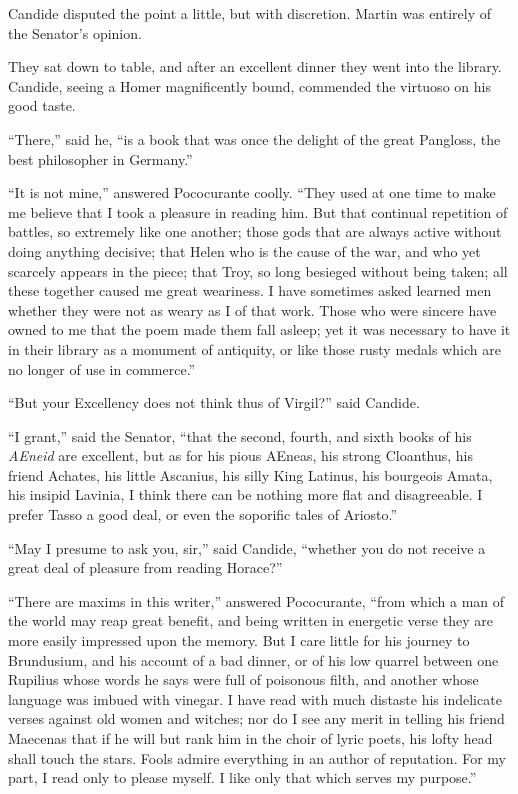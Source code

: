 Candide disputed the point a little, but with discretion. Martin was entirely of the Senator's opinion.

They sat down to table, and after an excellent dinner they went into the library. Candide, seeing a Homer magnificently bound, commended the virtuoso on his good taste.

``There,'' said he, ``is a book that was once the delight of the great Pangloss, the best philosopher in Germany.''

``It is not mine,'' answered Pococurante coolly. ``They used at one time to make me believe that I took a pleasure in reading him. But that continual repetition of battles, so extremely like one another; those gods that are always active without doing anything decisive; that Helen who is the cause of the war, and who yet scarcely appears in the piece; that Troy, so long besieged without being taken; all these together caused me great weariness. I have sometimes asked learned men whether they were not as weary as I of that work. Those who were sincere have owned to me that the poem made them fall asleep; yet it was necessary to have it in their library as a monument of antiquity, or like those rusty medals which are no longer of use in commerce.''

``But your Excellency does not think thus of Virgil?'' said Candide.

``I grant,'' said the Senator, ``that the second, fourth, and sixth books of his \textit{AEneid} are excellent, but as for his pious AEneas, his strong Cloanthus, his friend Achates, his little Ascanius, his silly King Latinus, his bourgeois Amata, his insipid Lavinia, I think there can be nothing more flat and disagreeable. I prefer Tasso a good deal, or even the soporific tales of Ariosto.''

``May I presume to ask you, sir,'' said Candide, ``whether you do not receive a great deal of pleasure from reading Horace?''

``There are maxims in this writer,'' answered Pococurante, ``from which a man of the world may reap great benefit, and being written in energetic verse they are more easily impressed upon the memory. But I care little for his journey to Brundusium, and his account of a bad dinner, or of his low quarrel between one Rupilius whose words he says were full of poisonous filth, and another whose language was imbued with vinegar. I have read with much distaste his indelicate verses against old women and witches; nor do I see any merit in telling his friend Maecenas that if he will but rank him in the choir of lyric poets, his lofty head shall touch the stars. Fools admire everything in an author of reputation. For my part, I read only to please myself. I like only that which serves my purpose.''

